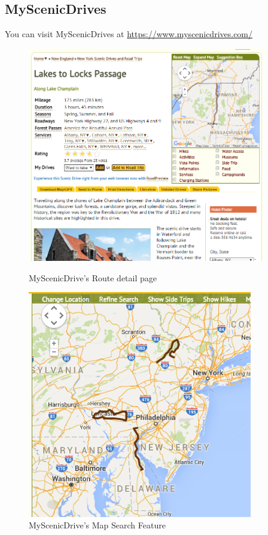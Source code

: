 \documentclass[a4paper,twoside,notitlepage,11pt]{article}
\begin{document}
\subsection{MyScenicDrives} 
You can visit MyScenicDrives at \url{https://www.myscenicdrives.com/}
\begin{figure}[!ht]
	\centering
	\begin{minipage}{.49\textwidth}
		\begin{center}
			\includegraphics[width=0.925\textwidth]{images/msd-1.png}
			\caption{MyScenicDrive's Route detail page}
		\end{center}
	\end{minipage}
	\begin{minipage}{.49\textwidth}
		\begin{center}
			\includegraphics[width=0.875\textwidth]{images/msd-2.png}
			\caption{MyScenicDrive's Map Search Feature}
		\end{center}
	\end{minipage}
\end{figure}
\newpage 
\end{document}
